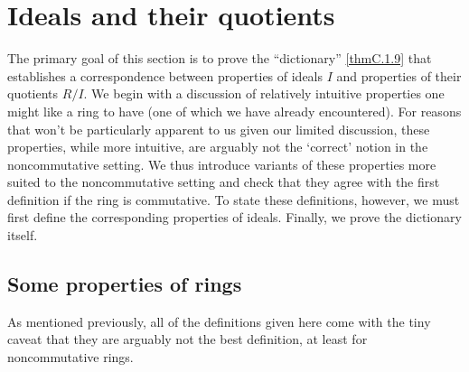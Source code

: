 \section{Ideals and their quotients}

The primary goal of this section is to prove the ``dictionary'' \cref{thmC.1.9} that establishes a correspondence between properties of ideals $I$ and properties of their quotients $R/I$.  We begin with a discussion of relatively intuitive properties one might like a ring to have (one of which we have already encountered).  For reasons that won't be particularly apparent to us given our limited discussion, these properties, while more intuitive, are arguably not the `correct' notion in the noncommutative setting.  We thus introduce variants of these properties more suited to the noncommutative setting and check that they agree with the first definition if the ring is commutative.  To state these definitions, however, we must first define the corresponding properties of ideals.  Finally, we prove the dictionary itself.

\subsection{Some properties of rings}\label{sbsC.1.1}

As mentioned previously, all of the definitions given here come with the tiny caveat that they are arguably not the best definition, at least for noncommutative rings.

